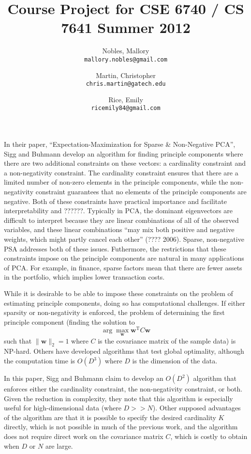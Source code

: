 \documentclass[twocolumn]{article}
\title{Course Project for CSE 6740 / CS 7641 Summer 2012}
\author{Nobles, Mallory \\ \texttt{mallory.nobles@gmail.com}
  \and Martin, Christopher \\ \texttt{chris.martin@gatech.edu}
  \and Rice, Emily \\ \texttt{ricemily84@gmail.com} }
\date{}
\begin{document}
\maketitle

In their paper, ``Expectation-Maximization for Sparse \& Non-Negative PCA'',
Sigg and Buhmann develop an algorithm for finding principle components where
there are two additional constraints on these vectors:
a cardinality constraint and a non-negativity constraint.
The cardinality constraint ensures that there are a limited number
of non-zero elements in the principle components, while
the non-negativity constraint guarantees that no elements of
the principle components are negative.
Both of these constraints have practical importance and facilitate
interpretability and ??????.
Typically in PCA, the dominant eigenvectors are difficult to interpret
because they are linear combinations of all of the observed variables,
and these linear combinations ``may mix both positive and negative weights,
which might partly cancel each other'' (???? 2006).
Sparse, non-negative PSA addresses both of these issues.
Futhermore, the restrictions that these constraints impose on the
principle components are natural in many applications of PCA.
For example, in finance, sparse factors mean that there are
fewer assets in the portfolio, which implies lower transaction costs.

While it is desirable to be able to impose these constraints on
the problem of estimating principle components, doing so has
computational challenges. If either sparsity or non-negativity
is enforced, the problem of determining the first principle component
(finding the solution to
\[ \arg\max_{\mathbf{w}} \mathbf{w}^ \mathrm{T} C\mathbf{w} \]
such that $\|\mathbf{w}\|_2 = 1$
where $C$ is the covariance matrix of the sample data) is NP-hard.
Others have developed algorithms that test global optimality, although
the computation time is $O(D^3)$ where $D$ is the dimension of the data.

In this paper, Sigg and Buhmann claim to develop an $O(D^2)$ algorithm
that enforces either the cardinality constraint,
the non-negativity constraint, or both.
Given the reduction in complexity, they note that this algorithm is
especially useful for high-dimensional data (where $D >> N$).
Other supposed advantages of the algorithm are that it is possible
to specify the desired cardinality $K$ directly, which is not possible
in much of the previous work, and the algorithm does not require
direct work on the covariance matrix $C$, which is costly to obtain
when $D$ or $N$ are large.
\end{document}
